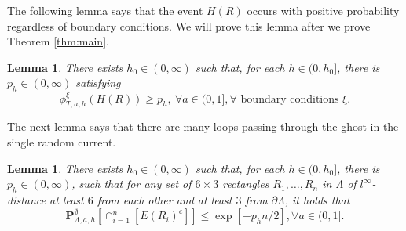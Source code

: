 \documentclass[article,12pt,reqno]{amsart}
\newtheorem{lemma}[theorem]{Lemma}
\begin{document}
The following lemma says that the event $H(R)$ occurs with positive probability regardless of boundary conditions. We will prove this lemma after we prove Theorem \ref{thm:main}.
\begin{lemma}\label{lem:FK}
	 There exists $h_0 \in (0,\infty)$ such that, for each $h\in(0,h_0]$, there is $p_h\in(0,\infty)$ satisfying
		\[\phi_{T,a,h}^{\xi}(H(R))\geq p_h,~\forall a\in(0,1],\forall \text{ boundary conditions }\xi.\]
\end{lemma}

The next lemma says that there are many loops passing through the ghost in the single random current.     
\begin{lemma}\label{lem:binomial}
	 There exists $h_0 \in (0,\infty)$ such that, for each $h\in(0,h_0]$, there is $p_h\in (0,\infty)$, such that for any set of $6 \times 3$ rectangles $R_1, \dots, R_n$ in $\Lambda$ of $l^{\infty}$-distance at least $6$ from each other and at least $3$ from $\partial \Lambda$, it holds that $$\mathbf{P}_{\Lambda,a,h}^{\emptyset}[\cap_{i=1}^n[E(R_i)^c] ] \leq \exp[-p_h n/2], \forall a\in(0,1].$$
\end{lemma}
\end{document}
